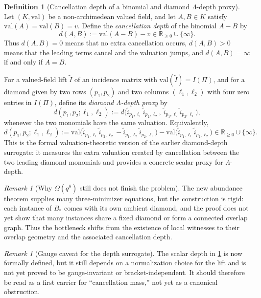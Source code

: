 \documentclass[11pt]{amsart}
\numberwithin{equation}{section}
\theoremstyle{plain}
\theoremstyle{definition}
\newtheorem{definition}[theorem]{Definition}
\theoremstyle{remark}
\newtheorem{remark}[theorem]{Remark}
\newcommand{\val}{\mathrm{val}}
\newcommand{\RR}{\mathbb{R}}
\newcommand{\Lam}{\Lambda}
\begin{document}
\begin{definition}[Cancellation depth of a binomial and diamond $\Lam$-depth proxy]
\label{def:diamond-lam-depth}
Let $(K,\val)$ be a non-archimedean valued field, and let $A,B\in K$ satisfy $\val(A)=\val(B)=v$. Define the
\emph{cancellation depth} of the binomial $A-B$ by
\[
d(A,B):=\val(A-B)-v\in \RR_{\ge 0}\cup\{\infty\}.
\]
Thus $d(A,B)=0$ means that no extra cancellation occurs, $d(A,B)>0$ means that the leading terms cancel and the valuation jumps, and
$d(A,B)=\infty$ if and only if $A=B$.

For a valued-field lift $\widetilde I$ of an incidence matrix with $\val(\widetilde I)=I(\Pi)$, and for a diamond given by two rows
$(p_1,p_2)$ and two columns $(\ell_1,\ell_2)$ with four zero entries in $I(\Pi)$, define its \emph{diamond $\Lam$-depth proxy} by
\[
d(p_1,p_2;\ell_1,\ell_2)
:=d\bigl(\widetilde i_{p_1,\ell_1}\widetilde i_{p_2,\ell_2},\ \widetilde i_{p_1,\ell_2}\widetilde i_{p_2,\ell_1}\bigr),
\]
whenever the two monomials have the same valuation. Equivalently,
\[
d(p_1,p_2;\ell_1,\ell_2)
:=\val\bigl(\widetilde i_{p_1,\ell_1}\widetilde i_{p_2,\ell_2}-\widetilde i_{p_1,\ell_2}\widetilde i_{p_2,\ell_1}\bigr)
-\val\bigl(\widetilde i_{p_1,\ell_1}\widetilde i_{p_2,\ell_2}\bigr)
\in \RR_{\ge 0}\cup\{\infty\}.
\]
This is the formal valuation-theoretic version of the earlier diamond-depth surrogate: it measures the extra valuation created by
cancellation between the two leading diamond monomials and provides a concrete scalar proxy for $\Lam$-depth.
\end{definition}

\begin{remark}[Why $\Omega(q^8)$ still does not finish the problem]
The new abundance theorem supplies many three-minimizer equations, but the construction is rigid: each instance of $B_*$ comes with its
own ambient diamond, and the proof does not yet show that many instances share a fixed diamond or form a connected overlap graph.
Thus the bottleneck shifts from the existence of local witnesses to their overlap geometry and the associated cancellation depth.
\end{remark}

\begin{remark}[Gauge caveat for the depth surrogate]
The scalar depth in \cref{def:diamond-lam-depth} is now formally defined, but it still depends on a normalization choice for the lift and
is not yet proved to be gauge-invariant or bracket-independent. It should therefore be read as a first carrier for ``cancellation mass,''
not yet as a canonical obstruction.
\end{remark}
\end{document}
